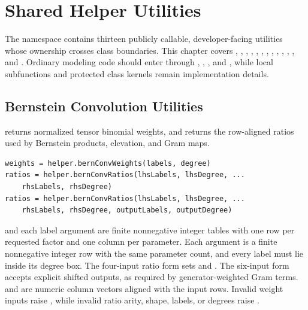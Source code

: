 \chapter{Shared Helper Utilities}
\label{sec:helpers}

The  namespace contains thirteen publicly callable, developer-facing utilities whose ownership crosses class boundaries. This chapter covers , , , , , , , , , , , , and . Ordinary modeling code should enter through , , , and , while local subfunctions and protected class kernels remain implementation details.

\section{Bernstein Convolution Utilities}
\label{sec:helper-bern-conv}

 returns normalized tensor binomial weights, and\linebreak {} returns the row-aligned ratios used by Bernstein products, elevation, and Gram maps.

\syntaxhead
\begin{lstlisting}[style=dpsyntax]
weights = helper.bernConvWeights(labels, degree)
ratios = helper.bernConvRatios(lhsLabels, lhsDegree, ...
    rhsLabels, rhsDegree)
ratios = helper.bernConvRatios(lhsLabels, lhsDegree, ...
    rhsLabels, rhsDegree, outputLabels, outputDegree)
\end{lstlisting}

\arghead
{} and each label argument are finite nonnegative integer tables with one row per requested factor and one column per parameter. Each  argument is a finite nonnegative integer row with the same parameter count, and every label must lie inside its degree box. The four-input ratio form sets  and . The six-input form accepts explicit shifted outputs, as required by generator-weighted Gram terms.  and  are numeric column vectors aligned with the input rows. Invalid weight inputs raise , while invalid ratio arity, shape, labels, or degrees raise .

